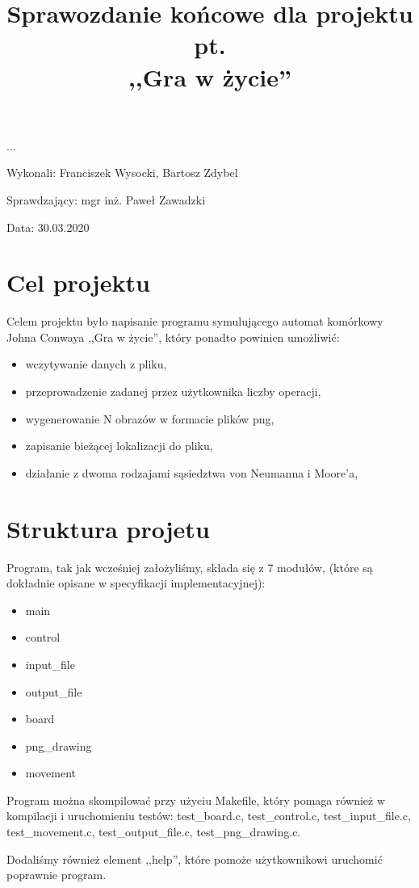 \documentclass{article}
\title{Sprawozdanie końcowe dla projektu pt. \\ ,,Gra w życie''}
\author{}
\date{}
\begin{document}
\maketitle

\begin{flushright}
\par ...
\vfill
\par
Wykonali: Franciszek Wysocki, Bartosz Zdybel

Sprawdzający: mgr inż. Paweł Zawadzki

Data: 30.03.2020
\end{flushright}

\thispagestyle{empty}
\newpage
\begin{frame}{}
    \tableofcontents
\end{frame}
\newpage
{}
\section{Cel projektu}
{\fontsize{14}{14}\selectfont
Celem projektu było napisanie programu symulującego automat komórkowy Johna Conwaya ,,Gra w życie'', który ponadto powinien umożliwić:
\begin{itemize}
\item wczytywanie danych z pliku,
\item przeprowadzenie zadanej przez użytkownika liczby operacji,
\item wygenerowanie N obrazów w formacie plików png,
\item zapisanie bieżącej lokalizacji do pliku,
\item działanie z dwoma rodzajami sąsiedztwa von Neumanna i Moore'a,
\end{itemize}

}
\section{Struktura projetu}
{\fontsize{14}{14}\selectfont
Program, tak jak wcześniej założyliśmy, składa się z 7 modułów, (które są dokładnie opisane w specyfikacji implementacyjnej):
\begin{itemize}
\item main
\item control
\item input\_file
\item output\_file
\item board
\item png\_drawing
\item movement 
\end{itemize}
Program można skompilować przy użyciu Makefile, który pomaga również w kompilacji i uruchomieniu testów: test\_board.c, test\_control.c, test\_input\_file.c, test\_movement.c, test\_output\_file.c, test\_png\_drawing.c.

Dodaliśmy również element ,,help'', które pomoże użytkownikowi uruchomić poprawnie program.
}
\end{document}
